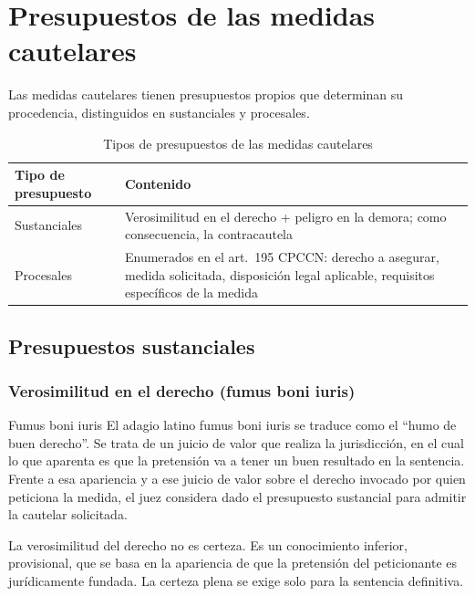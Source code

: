 \documentclass[12pt,oneside]{book}
\begin{document}
\section{Presupuestos de las medidas cautelares}

Las medidas cautelares tienen presupuestos propios que determinan su procedencia, distinguidos en sustanciales y procesales.

\begin{table}[H]
\centering
\begin{tabularx}{\textwidth}{
    >{\raggedright\arraybackslash}p{}
    >{\raggedright\arraybackslash}X
}
\toprule
\textbf{Tipo de presupuesto} & \textbf{Contenido} \\
\midrule
Sustanciales & Verosimilitud en el derecho + peligro en la demora; como consecuencia, la contracautela \\
Procesales & Enumerados en el art.\ 195 CPCCN: derecho a asegurar, medida solicitada, disposición legal aplicable, requisitos específicos de la medida \\
\bottomrule
\end{tabularx}
\caption{Tipos de presupuestos de las medidas cautelares}
\end{table}

\subsection{Presupuestos sustanciales}

\subsubsection{Verosimilitud en el derecho (fumus boni iuris)}

\begin{definition}{Fumus boni iuris}
El adagio latino fumus boni iuris se traduce como el ``humo de buen derecho''. Se trata de un juicio de valor que realiza la jurisdicción, en el cual lo que aparenta es que la pretensión va a tener un buen resultado en la sentencia. Frente a esa apariencia y a ese juicio de valor sobre el derecho invocado por quien peticiona la medida, el juez considera dado el presupuesto sustancial para admitir la cautelar solicitada.
\end{definition}

\begin{important}
La verosimilitud del derecho no es certeza. Es un conocimiento inferior, provisional, que se basa en la apariencia de que la pretensión del peticionante es jurídicamente fundada. La certeza plena se exige solo para la sentencia definitiva.
\end{important}
\end{document}
